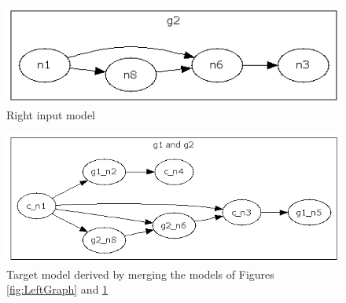 \begin{figure}
	\centering
		\includegraphics{images/RightGraph.png}
	\caption{Right input model}
	\label{fig:RightGraph}
\end{figure}


\begin{figure}
	\centering
		\includegraphics{images/MergedGraph.png}
	\caption{Target model derived by merging the models of Figures \ref{fig:LeftGraph} and \ref{fig:RightGraph}}
	\label{fig:TargetGraph}
\end{figure}